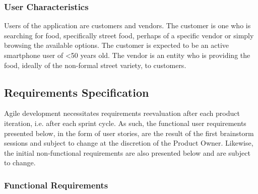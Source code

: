 \subsubsection{User Characteristics}
Users of the application are customers and vendors. The customer is one who is searching for food, specifically street food, perhaps of a specific vendor or simply browsing the available options. The customer is expected to be an active smartphone user of <50 years old. The vendor is an entity who is providing the food, ideally of the non-formal street variety, to customers.
\subsection{Requirements Specification}
Agile development necessitates requirements reevaluation after each product iteration, i.e. after each sprint cycle. As such, the functional user requirements presented below, in the form of user stories, are the result of the first brainstorm sessions and subject to change at the discretion of the Product Owner. Likewise, the initial non-functional requirements are also presented below and are subject to change.
\subsubsection{Functional Requirements}
